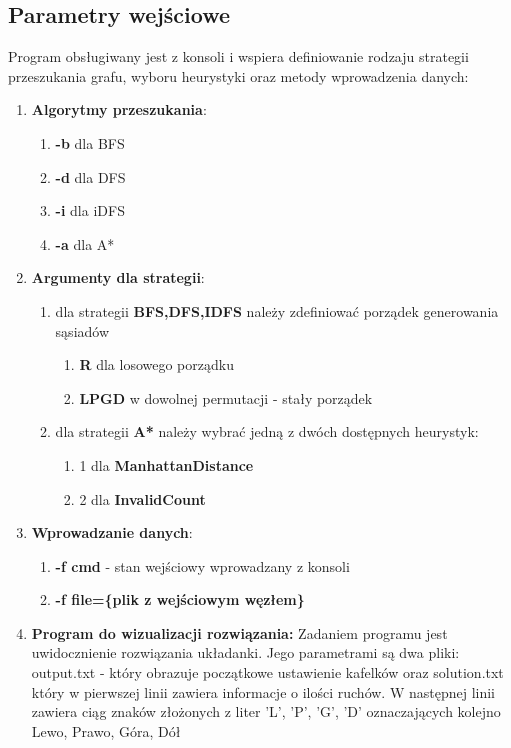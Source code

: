\documentclass{classrep}
\begin{document}
		\subsection{Parametry wejściowe}
			Program obsługiwany jest z konsoli i wspiera definiowanie rodzaju strategii przeszukania grafu,
			wyboru heurystyki oraz metody wprowadzenia danych:
			\begin{enumerate}
				\item \textbf{Algorytmy przeszukania}:
				\begin{enumerate}
					\item \textbf{-b} dla BFS
					\item \textbf{-d} dla DFS
					\item \textbf{-i} dla iDFS
					\item \textbf{-a} dla A*
				\end{enumerate}
				\item \textbf{Argumenty dla strategii}:
				\begin{enumerate}
					\item dla strategii \textbf{BFS,DFS,IDFS} należy zdefiniować porządek generowania sąsiadów
					\begin{enumerate}
						\item \textbf{R} dla losowego porządku
						\item \textbf{LPGD} w dowolnej permutacji - stały porządek
					\end{enumerate}
					\item dla strategii \textbf{A*} należy wybrać jedną z dwóch dostępnych heurystyk:
					\begin{enumerate}
						\item 1 dla \textbf{ManhattanDistance}
						\item 2 dla \textbf{InvalidCount}
					\end{enumerate}
				\end{enumerate}
				\item \textbf{Wprowadzanie danych}:
				\begin{enumerate}
					\item \textbf{-f cmd} - stan wejściowy wprowadzany z konsoli
					\item \textbf{-f file=\{plik z wejściowym węzłem\}}
				\end{enumerate}
					\item \textbf{Program do wizualizacji rozwiązania:}
					Zadaniem programu jest uwidocznienie rozwiązania układanki. Jego parametrami są dwa pliki: output.txt - który obrazuje początkowe ustawienie kafelków oraz solution.txt który w pierwszej linii zawiera informacje o ilości ruchów. W następnej linii zawiera ciąg znaków złożonych z liter 'L', 'P', 'G', 'D' oznaczających kolejno Lewo, Prawo, Góra, Dół 
				\end{enumerate}
			
\end{document}
